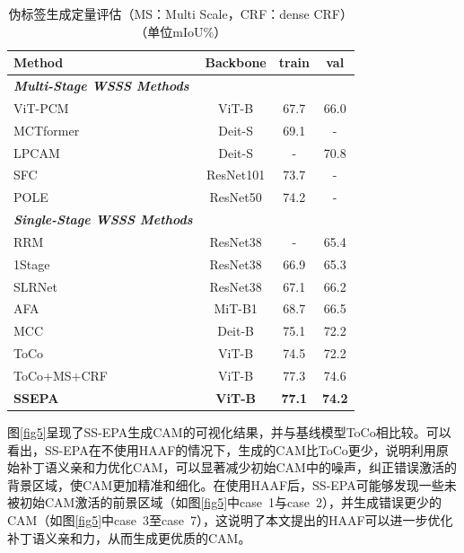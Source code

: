 \begin{table}[t]
    \setlength{\tabcolsep}{4mm}
    \tiny
    \centering
    \caption{伪标签生成定量评估（MS：Multi Scale，CRF：dense CRF）（单位mIoU\%）}\label{table1}
    \begin{tabular}{lccc}
        \toprule
        Method & Backbone & train & val \\
        \midrule
        \textbf{\textit{Multi-Stage WSSS Methods}}& & &\\
        ViT-PCM\cite{23rossetti2022max}	& ViT-B & 67.7 & 66.0\\
        MCTformer\cite{12xu2022multi} & Deit-S & 69.1 & -\\
        LPCAM\cite{24chen2023extracting} & Deit-S & - & 70.8\\
        SFC\cite{26zhao2024sfc} & ResNet101 & 73.7 & -\\
        POLE\cite{25murugesan2024prompting} & ResNet50 & 74.2 & -\\
        \cmidrule[0.4pt](lr){1-4}
        \textbf{\textit{Single-Stage WSSS Methods}}& & &\\
        RRM\cite{17zhang2020reliability} & ResNet38 & - & 65.4\\
        1Stage\cite{27araslanov2020single} & ResNet38 & 66.9 & 65.3\\
        SLRNet\cite{28pan2022learning} & ResNet38 & 67.1 & 66.2\\
        AFA\cite{13ru2022learning} & MiT-B1 & 68.7 & 66.5\\
        MCC\cite{29wu2024masked} & Deit-B & 75.1 & 72.2\\
        ToCo\cite{03ru2023token} & ViT-B & 74.5 & 72.2\\
        ToCo+MS+CRF\cite{03ru2023token} & ViT-B & 77.3 & 74.6\\
        \textbf{SSEPA} & \textbf{ViT-B} & \textbf{77.1} & \textbf{74.2}\\
        \bottomrule
    \end{tabular}
\end{table}

图\ref{fig5}呈现了SS-EPA生成CAM的可视化结果，并与基线模型ToCo相比较。可以看出，SS-EPA在不使用HAAF的情况下，生成的CAM比ToCo更少，说明利用原始补丁语义亲和力优化CAM，可以显著减少初始CAM中的噪声，纠正错误激活的背景区域，使CAM更加精准和细化。在使用HAAF后，SS-EPA可能够发现一些未被初始CAM激活的前景区域（如图\ref{fig5}中case~1与case~2），并生成错误更少的CAM（如图\ref{fig5}中case~3至case~7），这说明了本文提出的HAAF可以进一步优化补丁语义亲和力，从而生成更优质的CAM。

